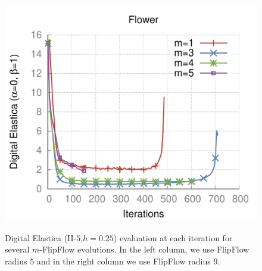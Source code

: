 {\begin{figure}
{\includegraphics[scale=0.5]{figures/chapter6/level-effect/flower/improve/len_pen0/radius-5/level1/level-effect.pdf}}%
%
\caption{Digital Elastica (II-$5$,$h=0.25$) evaluation at each iteration for several $m$-FlipFlow evolutions. In the left column, we use FlipFlow radius $5$ and in the right column we use FlipFlow radius $9$. }
\label{fig:mrings-plots-r5-r9}
\end{figure}

}
